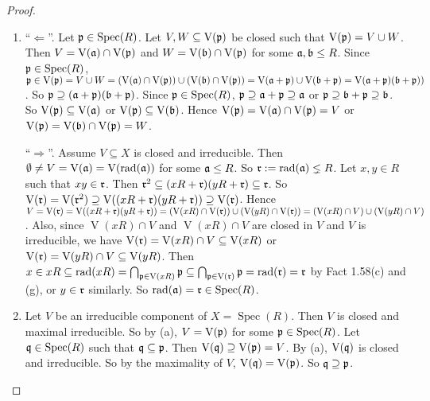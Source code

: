 \begin{proof}
    \begin{enumerate}
        \item ``$\Leftarrow$''. Let $\mathfrak{p} \in \operatorname{Spec}(R)$. Let $V,W \subseteq \operatorname{V}(\mathfrak{p})$ be closed such that $\operatorname{V}(\mathfrak{p}) = V \cup W$. Then $V = \operatorname{V}(\mathfrak{a}) \cap \operatorname{V}(\mathfrak{p})$ and $W = \operatorname{V}(\mathfrak{b}) \cap \operatorname{V}(\mathfrak{p})$ for some $\mathfrak{a},\mathfrak{b} \leq R$. Since $\mathfrak{p} \in \operatorname{Spec}(R)$, $\mathfrak{p} \in \operatorname{V}(\mathfrak{p}) = V \cup W = (\operatorname{V}(\mathfrak{a}) \cap \operatorname{V}(\mathfrak{p})) \cup (\operatorname{V}(\mathfrak{b}) \cap \operatorname{V}(\mathfrak{p})) = \operatorname{V}(\mathfrak{a} + \mathfrak{p}) \cup \operatorname{V}(\mathfrak{b} + \mathfrak{p})= \operatorname{V}(\mathfrak{a} + \mathfrak{p})(\mathfrak{b}+\mathfrak{p}))$. So $\mathfrak{p} \supseteq (\mathfrak{a} + \mathfrak{p})(\mathfrak{b} + \mathfrak{p})$. Since $\mathfrak{p} \in \operatorname{Spec}(R)$, $\mathfrak{p} \supseteq \mathfrak{a} + \mathfrak{p} \supseteq \mathfrak{a}$ or $\mathfrak{p} \supseteq \mathfrak{b} + \mathfrak{p} \supseteq \mathfrak{b}$. So $\operatorname{V}(\mathfrak{p}) \subseteq \operatorname{V}(\mathfrak{a})$ or $\operatorname{V}(\mathfrak{p}) \subseteq \operatorname{V}(\mathfrak{b})$. Hence $\operatorname{V}(\mathfrak{p}) = \operatorname{V}(\mathfrak{a}) \cap \operatorname{V}(\mathfrak{p}) = V$ or $\operatorname{V}(\mathfrak{p}) = \operatorname{V}(\mathfrak{b}) \cap \operatorname{V}(\mathfrak{p}) = W$. \par
        ``$\Rightarrow$''. Assume $V \subseteq X$ is closed and irreducible. Then $\emptyset \neq V = \operatorname{V}(\mathfrak{a}) = \operatorname{V}(\operatorname{rad}(\mathfrak{a})) $ for some $\mathfrak{a} \leq R$. So $\mathfrak{r} := \operatorname{rad}(\mathfrak{a}) \lneq R$. Let $x,y \in R$ such that $xy \in \mathfrak{r}$. Then $\mathfrak{r}^2 \subseteq (xR+\mathfrak{r})(yR+\mathfrak{r}) \subseteq \mathfrak{r}$. So $\operatorname{V}(\mathfrak{r}) = \operatorname{V}(\mathfrak{r}^2) \supseteq \operatorname{V}((xR+\mathfrak{r})(yR+\mathfrak{r})) \supseteq \operatorname{V}(\mathfrak{r})$. Hence $V = \operatorname{V}(\mathfrak{r}) = \operatorname{V}((xR + \mathfrak{r})(yR+\mathfrak{r})) = (\operatorname{V}(xR) \cap \operatorname{V}(\mathfrak{r})) \cup (\operatorname{V}(yR) \cap \operatorname{V}(\mathfrak{r})) = (\operatorname{V}(xR) \cap V) \cup (\operatorname{V}(yR) \cap V)$. Also, since $\operatorname{V}(xR) \cap V$ and $\operatorname{V}(xR) \cap V$ are closed in $V$ and $V$ is irreducible, we have $\operatorname{V}(\mathfrak{r}) = \operatorname{V}(xR) \cap V \subseteq \operatorname{V}(xR)$ or $\operatorname{V}(\mathfrak{r}) = \operatorname{V}(yR) \cap V \subseteq \operatorname{V}(yR)$. Then $x \in xR \subseteq \operatorname{rad}(xR) = \bigcap_{\mathfrak{p} \in \operatorname{V}(xR)} \mathfrak{p} \subseteq \bigcap_{\mathfrak{p} \in \operatorname{V}(\mathfrak{r})} \mathfrak{p} = \operatorname{rad}(\mathfrak{r}) = \mathfrak{r}$ by Fact 1.58(c) and (g), or $y \in \mathfrak{r}$ similarly. So $\operatorname{rad}(\mathfrak{a}) = \mathfrak{r} \in \operatorname{Spec}(R)$.
    \item Let $V$ be an irreducible component of $X = \operatorname{Spec}(R)$. Then $V$ is closed and maximal irreducible. So by (a), $V = \operatorname{V}(\mathfrak{p})$ for some $\mathfrak{p} \in \operatorname{Spec}(R)$. Let $\mathfrak{q} \in \operatorname{Spec}(R)$ such that $\mathfrak{q} \subseteq \mathfrak{p}$. Then $\operatorname{V}(\mathfrak{q}) \supseteq \operatorname{V}(\mathfrak{p}) = V$. By (a), $\operatorname{V}(\mathfrak{q})$ is closed and irreducible. So by the maximality of $V$, $\operatorname{V}(\mathfrak{q}) = \operatorname{V}(\mathfrak{p})$. So $\mathfrak{q} \supseteq \mathfrak{p}$. \qedhere
    \end{enumerate}
\end{proof}

